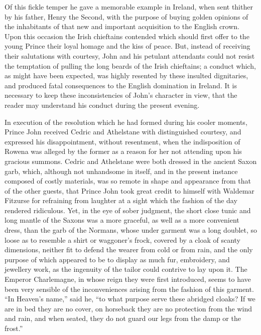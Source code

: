 Of this fickle temper he gave a memorable example in Ireland, when sent
thither by his father, Henry the Second, with the purpose of buying
golden opinions of the inhabitants of that new and important acquisition
to the English crown. Upon this occasion the Irish chieftains contended
which should first offer to the young Prince their loyal homage and the
kiss of peace. But, instead of receiving their salutations with
courtesy, John and his petulant attendants could not resist the
temptation of pulling the long beards of the Irish chieftains; a conduct
which, as might have been expected, was highly resented by these
insulted dignitaries, and produced fatal consequences to the English
domination in Ireland. It is necessary to keep these inconsistencies of
John's character in view, that the reader may understand his conduct
during the present evening.

In execution of the resolution which he had formed during his cooler
moments, Prince John received Cedric and Athelstane with distinguished
courtesy, and expressed his disappointment, without resentment, when the
indisposition of Rowena was alleged by the former as a reason for her
not attending upon his gracious summons. Cedric and Athelstane were both
dressed in the ancient Saxon garb, which, although not unhandsome in
itself, and in the present instance composed of costly materials, was so
remote in shape and appearance from that of the other guests, that
Prince John took great credit to himself with Waldemar Fitzurse for
refraining from laughter at a sight which the fashion of the day
rendered ridiculous. Yet, in the eye of sober judgment, the short close
tunic and long mantle of the Saxons was a more graceful, as well as a
more convenient dress, than the garb of the Normans, whose under garment
was a long doublet, so loose as to resemble a shirt or waggoner's frock,
covered by a cloak of scanty dimensions, neither fit to defend the
wearer from cold or from rain, and the only purpose of which appeared to
be to display as much fur, embroidery, and jewellery work, as the
ingenuity of the tailor could contrive to lay upon it. The Emperor
Charlemagne, in whose reign they were first introduced, seems to have
been very sensible of the inconveniences arising from the fashion of
this garment. ``In Heaven's name,'' said he, ``to what purpose serve
these abridged cloaks? If we are in bed they are no cover, on horseback
they are no protection from the wind and rain, and when seated, they do
not guard our legs from the damp or the frost.''

